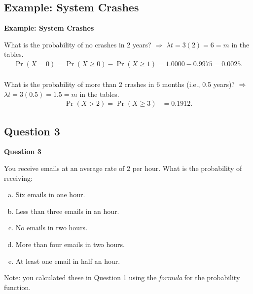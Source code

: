 \documentclass[compress]{beamer}        %
\makeatletter
\newcommand{\tcb}{\textcolor{beamer@blendedblue}}
\makeatother
\begin{document}
\subsection{Example: System Crashes}
\begin{frame}{\bf \tcb{Example: System Crashes}}

What is the probability of no crashes in 2 years? $\Rightarrow$ $\lambda t = 3(2) = 6 = m$ in the tables.
\begin{align*}
\Pr(X=0) = \Pr(X \ge 0) - \Pr(X \ge 1) = 1.0000 - 0.9975 = 0.0025.\\[0.2cm]
\end{align*}

What is the probability of more than 2 crashes in 6 months (i.e., 0.5 years)? $\Rightarrow$ $\lambda t = 3(0.5) = 1.5 = m$ in the tables.
\begin{align*}
\Pr(X > 2) = \Pr(X\ge3) &= 0.1912.
\end{align*}

\end{frame}


\subsection{Question 3}
\begin{frame}{\bf \tcb{Question 3}}


You receive emails at an average rate of 2 per hour. What is the probability of receiving:\\[0.2cm]

\begin{enumerate}[a)]\itemsep0.2cm
\item Six emails in one hour.
\item Less than three emails in an hour.
\item No emails in two hours.
\item More than four emails in two hours.
\item At least one email in half an hour.\\[0.8cm]
\end{enumerate}

Note: you calculated these in Question 1 using the \emph{formula} for the probability function.

\end{frame}
\end{document}
